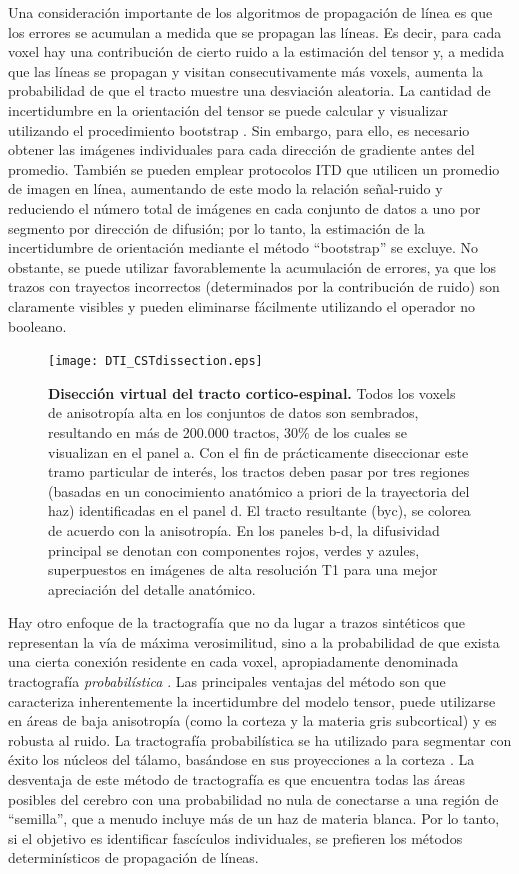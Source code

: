 \documentclass[12pt,a5,twoside]{book}
\begin{document}
Una consideración importante de los algoritmos de propagación de línea es que los errores se acumulan a medida que se propagan las líneas. Es decir, para cada voxel hay una contribución de cierto ruido a la estimación del tensor y, a medida que las líneas se propagan y visitan consecutivamente más voxels, aumenta la probabilidad de que el tracto muestre una desviación aleatoria. La cantidad de incertidumbre en la orientación del tensor se puede calcular y visualizar utilizando el procedimiento bootstrap \citep{Jones_2003}. Sin embargo, para ello, es necesario obtener las imágenes individuales para cada dirección de gradiente antes del promedio. También se pueden emplear protocolos ITD que utilicen un promedio de imagen en línea, aumentando de este modo la relación señal-ruido y reduciendo el número total de imágenes en cada conjunto de datos a uno por segmento por dirección de difusión; por lo tanto, la estimación de la incertidumbre de orientación mediante el método ``bootstrap'' se excluye. No obstante, se puede utilizar favorablemente la acumulación de errores, ya que los trazos con trayectos incorrectos (determinados por la contribución de ruido) son claramente visibles y pueden eliminarse fácilmente utilizando el operador no booleano.

\begin{figure}
	\centering
    \texttt{[image: DTI\_CSTdissection.eps]}
    \caption{\textbf{Disección virtual del tracto cortico-espinal.} Todos los voxels de anisotropía alta en los conjuntos de datos son sembrados, resultando en más de 200.000 tractos, 30\% de los cuales se visualizan en el panel a. Con el fin de prácticamente diseccionar este tramo particular de interés, los tractos deben pasar por tres regiones (basadas en un conocimiento anatómico a priori de la trayectoria del haz) identificadas en el panel d. El tracto resultante (byc), se colorea de acuerdo con la anisotropía. En los paneles b-d, la difusividad principal se denotan con componentes rojos, verdes y azules, superpuestos en imágenes de alta resolución T1 para una mejor apreciación del detalle anatómico.}
    \label{F:DTI_CSTdissection}
\end{figure}

Hay otro enfoque de la tractografía que no da lugar a trazos sintéticos que representan la vía de máxima verosimilitud, sino a la probabilidad de que exista una cierta conexión residente en cada voxel, apropiadamente denominada tractografía {\it probabilística} \citep{Behrens_2003}. Las principales ventajas del método son que caracteriza inherentemente la incertidumbre del modelo tensor, puede utilizarse en áreas de baja anisotropía (como la corteza y la materia gris subcortical) y es robusta al ruido. La tractografía probabilística se ha utilizado para segmentar con éxito los núcleos del tálamo, basándose en sus proyecciones a la corteza \citep{Behrens_2003}. La desventaja de este método de tractografía es que encuentra todas las áreas posibles del cerebro con una probabilidad no nula de conectarse a una región de ``semilla'', que a menudo incluye más de un haz de materia blanca. Por lo tanto, si el objetivo es identificar fascículos individuales, se prefieren los métodos determinísticos de propagación de líneas.
\end{document}
